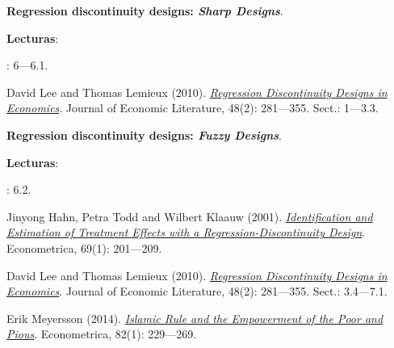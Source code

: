 \documentclass[letterpaper]{article}
\renewenvironment{itemize}{
  \begin{list}{}{
    \setlength{\leftmargin}{1.5em}
  }
}{
  \end{list}
}
\begin{document}
\begin{enumerate}[label=\roman*.]
          \begin{itemize} 
            \item[4.] {\bf Regression discontinuity designs: \emph{Sharp Designs}}.
                \begin{itemize} 
                \item[$\circ$] {\bf Lecturas}: 
                  \begin{itemize} 
                    \item[$\diamond$] \textcite{Angrist2009}: 6---6.1.
                     \item[$\diamond$] David Lee and Thomas Lemieux (2010). \href{https://github.com/hbahamonde/MLE/raw/master/Readings/Lee_RDD.pdf}{\emph{Regression Discontinuity Designs in Economics}}. Journal of Economic Literature, 48(2): 281---355. Sect.: 1---3.3.
                   \end{itemize}
                \end{itemize}
            \end{itemize}


            \begin{itemize} 
            \item[5.] {\bf Regression discontinuity designs: \emph{Fuzzy Designs}}.
                \begin{itemize} 
                \item[$\circ$] {\bf Lecturas}: 
                  \begin{itemize} 
                    \item[$\diamond$] \textcite{Angrist2009}: 6.2.
                    \item[$\diamond$] Jinyong Hahn, Petra Todd and Wilbert Klaauw (2001). \href{https://github.com/hbahamonde/MLE/raw/master/Readings/Hahn_RDD.pdf}{\emph{Identification and Estimation of Treatment Effects with a Regression-Discontinuity Design}}. Econometrica, 69(1): 201---209.
                    \item[$\diamond$] David Lee and Thomas Lemieux (2010). \href{https://github.com/hbahamonde/MLE/raw/master/Readings/Lee_RDD.pdf}{\emph{Regression Discontinuity Designs in Economics}}. Journal of Economic Literature, 48(2): 281---355. Sect.: 3.4---7.1.
                    \item[$\diamond$] Erik Meyersson (2014). \href{https://github.com/hbahamonde/MLE/raw/master/Readings/Meyersson.pdf}{\emph{Islamic Rule and the Empowerment of the Poor and Pious}}. Econometrica, 82(1): 229---269.
                  \end{itemize}
                \end{itemize}
            \end{itemize}



\end{enumerate}
\end{document}
